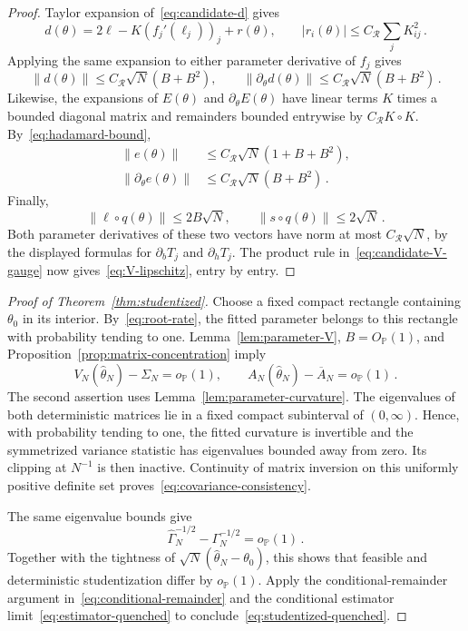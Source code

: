 \documentclass[11pt]{amsart}
\numberwithin{equation}{section}
\theoremstyle{remark}
\newcommand{\Pp}{\mathbb P}
\begin{document}
\begin{proof}
Taylor expansion of~\eqref{eq:candidate-d} gives
\begin{equation*}
 d(\theta)=2\ell-K(f_j'(\ell_j))_j+r(\theta),
 \qquad |r_i(\theta)|\le C_{\mathcal R}\sum_jK_{ij}^2\,.
\end{equation*}
Applying the same expansion to either parameter derivative of $f_j$ gives
\begin{equation*}
 \|d(\theta)\|\le C_{\mathcal R}\sqrt N(B+B^2),
 \qquad
 \|\partial_\theta d(\theta)\|\le C_{\mathcal R}\sqrt N(B+B^2)\,.
\end{equation*}
Likewise, the expansions of $E(\theta)$ and $\partial_\theta E(\theta)$ have linear terms $K$ times a bounded diagonal matrix and remainders bounded entrywise by $C_{\mathcal R}K\circ K$. By~\eqref{eq:hadamard-bound},
\begin{align*}
 \|e(\theta)\|&\le C_{\mathcal R}\sqrt N(1+B+B^2),\\
 \|\partial_\theta e(\theta)\|&\le C_{\mathcal R}\sqrt N(B+B^2)\,.
\end{align*}
Finally,
\begin{equation*}
 \|\ell\circ q(\theta)\|\le2B\sqrt N,
 \qquad \|s\circ q(\theta)\|\le2\sqrt N\,.
\end{equation*}
Both parameter derivatives of these two vectors have norm at most $C_{\mathcal R}\sqrt N$, by the displayed formulas for $\partial_bT_j$ and $\partial_hT_j$. The product rule in~\eqref{eq:candidate-V-gauge} now gives~\eqref{eq:V-lipschitz}, entry by entry.
\end{proof}

\begin{proof}[Proof of Theorem~\ref{thm:studentized}]
Choose a fixed compact rectangle containing $\theta_0$ in its interior. By~\eqref{eq:root-rate}, the fitted parameter belongs to this rectangle with probability tending to one. Lemma~\ref{lem:parameter-V}, $B=O_{\Pp}(1)$, and Proposition~\ref{prop:matrix-concentration} imply
\begin{equation}
 V_N(\widehat\theta_N)-\Sigma_N=o_{\Pp}(1),\qquad
 A_N(\widehat\theta_N)-\overline A_N=o_{\Pp}(1)\,.
 \label{eq:fitted-matrix-consistency}
\end{equation}
The second assertion uses Lemma~\ref{lem:parameter-curvature}. The eigenvalues of both deterministic matrices lie in a fixed compact subinterval of $(0,\infty)$. Hence, with probability tending to one, the fitted curvature is invertible and the symmetrized variance statistic has eigenvalues bounded away from zero. Its clipping at $N^{-1}$ is then inactive. Continuity of matrix inversion on this uniformly positive definite set proves~\eqref{eq:covariance-consistency}.

The same eigenvalue bounds give
\begin{equation*}
 \widehat\Gamma_N^{-1/2}-\Gamma_N^{-1/2}=o_{\Pp}(1)\,.
\end{equation*}
Together with the tightness of $\sqrt N(\widehat\theta_N-\theta_0)$, this shows that feasible and deterministic studentization differ by $o_{\Pp}(1)$. Apply the conditional-remainder argument in~\eqref{eq:conditional-remainder} and the conditional estimator limit~\eqref{eq:estimator-quenched} to conclude~\eqref{eq:studentized-quenched}.
\end{proof}
\end{document}
